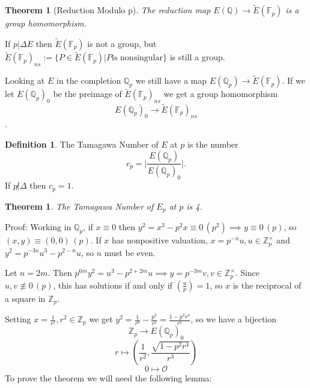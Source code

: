\documentclass[11pt,a4paper]{amsart}
\theoremstyle{plain}
\newtheorem{thm}[prop]{Theorem}
\theoremstyle{definition}
\newtheorem{defn}[prop]{Definition}
\theoremstyle{remark}
\numberwithin{equation}{section}
\newcommand{\ZZ}{{\mathbb Z}}
\newcommand{\QQ}{{\mathbb Q}}
\newcommand{\FF}{{\mathbb F}}
\newcommand{\EFp}{{\tilde{E}(\FF_p)}}
\newcommand{\EQp}{{E(\QQ_p)}}
\newcommand{\1}{{\mathds 1}}
\begin{document}
\begin{thm}[Reduction Modulo p]
  The reduction map $E(\QQ) \rightarrow \tilde{E}(\FF_p)$ is a group homomorphism.
\end{thm}

If $p | \Delta E$ then $\tilde{E}(\FF_p)$ is not a group, but
$\tilde{E}(\FF_p)_{ns} := \{P \in \tilde{E}(\FF_p) | P \text{is nonsingular}\}$
is still a group.

Looking at $E$ in the completion $\QQ_p$ we still have a map $\EQp \rightarrow
\EFp$.
If we let $\EQp_0$ be the preimage of $\EFp_{ns}$ we get a group homomorphism
$$ \EQp_0 \rightarrow \EFp_{ns} $$.

\begin{defn}
  The Tamagawa Number of $E$ at $p$ is the number
  $$c_p = \big| \frac{\EQp}{\EQp_0}
  \big|.$$
  If $p \not| \Delta$ then $c_p = 1$.
\end{defn}  

\begin{thm}
  The Tamagawa Number of $E_p$ at $p$ is 4.
\end{thm}
Proof: Working in $\QQ_p$, if $x \equiv 0$ then $y^2 = x^3 - p^2 x \equiv 0 \,
(p^2) \implies y \equiv 0 \, (p)$, so $(x, y) \equiv (0,0) \, (p)$.
If $x$ has nonpositive valuation, $x = p^{-n} u, u \in \ZZ_p^{\times}$ and $y^2 =
p^{-3n}u^3 - p^{2-n} u$, so $n$ must be even. 

Let $n = 2m$. Then $p^{6m} y^2 = u^3 - p^{2+2m}u \implies y = p^{-3m}v, v \in
\ZZ_p^{\times}$. Since $u, v \not\equiv 0 
\, (p)$, this has solutions if and only if $(\frac{u}{p}) = 1$, so $x$ is the
reciprocal of a square in $\ZZ_p$.

Setting $x = \frac {1}{r^2}, r^2 \in \ZZ_p$ we get $y^2 = \frac{1}{r^6} -
\frac{p^2}{r^2} = \frac{1 - p^2r^4}{r^6}$, so we have a bijection
\[\ZZ_p \rightarrow \EQp_0\]
\[r \mapsto (\frac{1}{r^2}, \frac{\sqrt{1-p^2r^4}}{r^3})\]
\[0 \mapsto \mathcal O\]
To prove the theorem we will need the following lemma:
\end{document}
